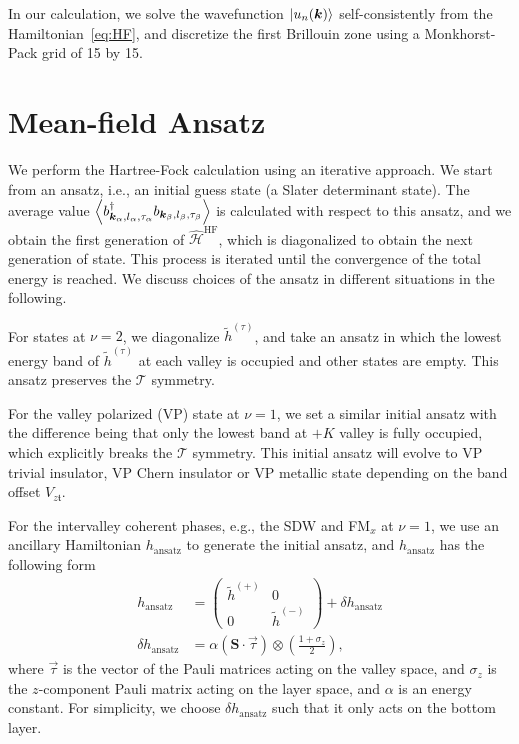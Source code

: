 \documentclass[aps,prl,onecolumn,superscriptaddress,longbibliography]{revtex4-2}
\begin{document}
{In our calculation, we solve the wavefunction $\ket{u_n(\bm{k})}$ self-consistently from the Hamiltonian~\eqref{eq:HF}, and discretize the first Brillouin zone using a Monkhorst-Pack grid of 15 by 15.~\cite{monkhorst1976special}  
}
\section{Mean-field Ansatz}

We perform the Hartree-Fock calculation using an iterative approach. We start from an ansatz, i.e., an initial guess state (a Slater determinant state). The average value $\expval{ b_{\bm{k}_{\alpha},l_{\alpha},\tau_{\alpha}}^\dagger b_{\bm{k}_{\beta},l_{\beta},\tau_{\beta}}}$ is calculated with respect to this ansatz, and we obtain the first generation of $\hat{\mathcal{H}}^{\text{HF}}$, which is diagonalized to obtain the next generation of state. This process is iterated until the convergence of the total energy is reached. We discuss choices of the ansatz in different situations in the following.

For states at $\nu=2$, we diagonalize $\tilde{h}^{(\tau)}$, and take an ansatz in which the lowest energy band of $\tilde{h}^{(\tau)}$ at each valley is occupied and  other states are empty. This ansatz preserves the $\mathcal{T}$ symmetry.

For the valley polarized (VP) state at $\nu=1$, we set a similar initial ansatz with the difference being that only the lowest band at $+K$ valley is fully occupied, which explicitly breaks the $\mathcal{T}$ symmetry. This initial ansatz will evolve to VP trivial insulator, VP Chern insulator or VP metallic state depending on the band offset $V_{z\mathfrak{t}}$.

For the intervalley coherent phases, e.g., the SDW and FM$_x$ at $\nu=1$, we use an ancillary Hamiltonian $h_{\text{ansatz}}$ to generate the initial ansatz, and $h_{\text{ansatz}}$ has the following form
\begin{equation}
\begin{aligned}
h_{\text{ansatz}} & =\begin{pmatrix}
\tilde{h}^{(+)} & 0 \\
0 & \tilde{h}^{(-)}
\end{pmatrix}
+\delta h_{\text{ansatz}} \\
\delta h_{\text{ansatz}} & = \alpha (\bm{S}\cdot \vec{\tau})\otimes \left(\frac{1+\sigma_z}{2}\right),
\end{aligned}
\end{equation}
where $\vec{\tau}$ is the vector of the Pauli matrices acting on the valley space, and $\sigma_z$ is the $z$-component Pauli matrix acting on the layer space, and $\alpha$ is an energy constant. For simplicity, we choose $\delta h_{\text{ansatz}}$ such that it only acts on the bottom layer.
\end{document}
